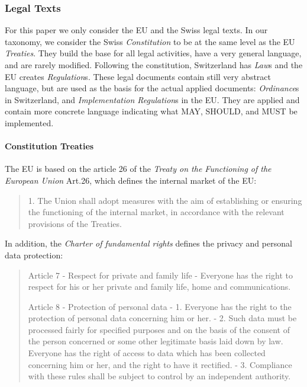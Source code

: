 \subsubsection{Legal Texts} 

For this paper we only consider the EU and the Swiss legal texts.
In our taxonomy, we consider the Swiss \emph{Constitution} to be
at the same level as the EU \emph{Treaties}.
They build the base for all legal activities, have a very general
language, and are rarely modified.
Following the constitution, Switzerland has \emph{Law}s and the EU
creates \emph{Regulation}s.
These legal documents contain still very abstract language, but
are used as the basis for the actual applied documents:
\emph{Ordinance}s in Switzerland, and 
\emph{Implementation Regulation}s in the EU.
They are applied and contain more concrete language
indicating what MAY, SHOULD, and MUST be implemented.

\vspace{1cm}


\paragraph{Constitution Treaties}

The EU \eid is based on the article 26 of the \emph{Treaty on the Functioning of the European Union}
\cite{EUTreaties}{Art.26}, which defines the internal market of the EU:
\begin{quote}
    1.   The Union shall adopt measures with the aim of establishing or ensuring the functioning of the internal market, in accordance with the relevant provisions of the Treaties.
\end{quote}
In addition, the \emph{Charter of fundamental rights} defines the privacy and personal data protection:
\begin{quote}
    Article 7 - Respect for private and family life - Everyone has the right to respect for his or her private and family life, home and communications.
    
    Article 8 - Protection of personal data - 1.   Everyone has the right to the protection of personal data concerning him or her.
    - 2.   Such data must be processed fairly for specified purposes and on the basis of the consent of the person concerned or some other legitimate basis laid down by law. Everyone has the right of access to data which has been collected concerning him or her, and the right to have it rectified. - 3.   Compliance with these rules shall be subject to control by an independent authority.
\end{quote}

